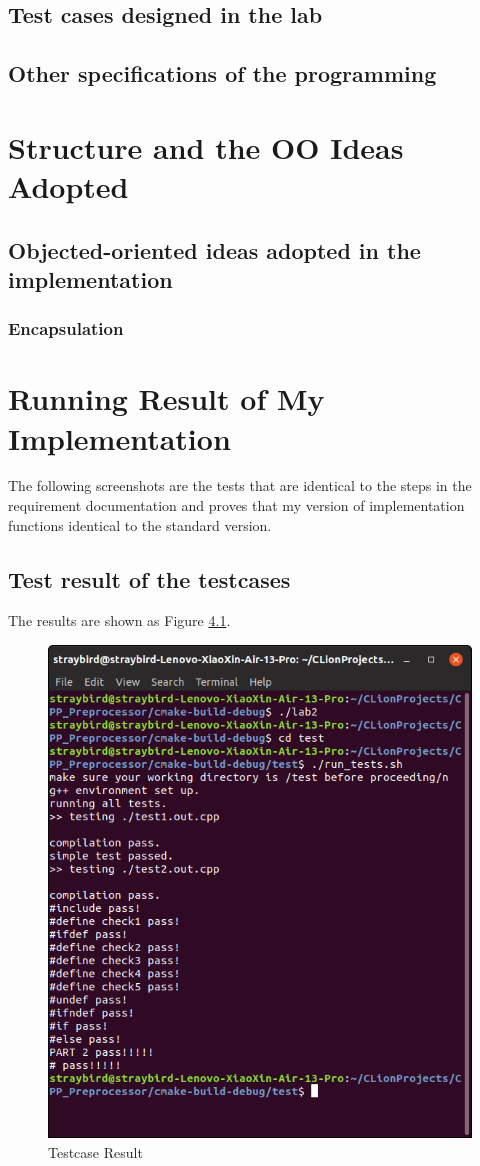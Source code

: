\documentclass[a4paper]{report}
\begin{document}
\section{Test cases designed in the lab}


\section{Other specifications of the programming}

\chapter{Structure and  the OO Ideas Adopted}
\section{Objected-oriented ideas adopted in the implementation}
\subsection{Encapsulation}


\chapter{Running Result of My Implementation}
The following screenshots are the tests that are identical to the steps in the requirement documentation and proves that my version of implementation functions identical to the standard version.
\section{Test result of the testcases}
The results are shown as Figure \ref{2}. 

\begin{figure}
  \centering
  \includegraphics[width=12cm]{shell.png}
  \caption{Testcase Result}\label{2}
\end{figure}
\end{document}
